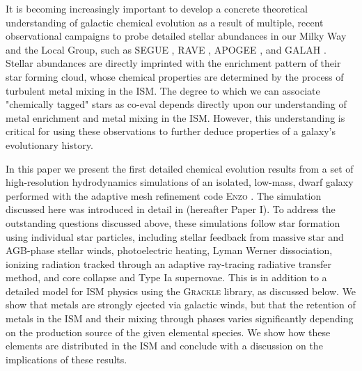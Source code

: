 \documentclass[twocolumn]{aastex61}
\begin{document}
It is becoming increasingly important to develop a concrete theoretical understanding of galactic chemical evolution as a result of multiple, recent observational campaigns to probe detailed stellar abundances in our Milky Way and the Local Group, such as SEGUE \citep{Yanny2009}, RAVE \citep{Kunder2017}, APOGEE \citep{Anders2014}, and GALAH \citep{Buder2018}. Stellar abundances are directly imprinted with the enrichment pattern of their star forming cloud, whose chemical properties are determined by the process of turbulent metal mixing in the ISM. The degree to which we can associate "chemically tagged" stars as co-eval depends directly upon our understanding of metal enrichment and metal mixing in the ISM. However, this understanding is critical for using these observations to further deduce properties of a galaxy's evolutionary history.

In this paper we present the first detailed chemical evolution results from a set of high-resolution hydrodynamics simulations of an isolated, low-mass, dwarf galaxy performed with the adaptive mesh refinement code \textsc{Enzo} \citep{Enzo2014}. The simulation discussed here was introduced in detail in \cite{Emerick2018} (hereafter Paper I). To address the outstanding questions discussed above, these simulations follow star formation using individual star particles, including stellar feedback from massive star and AGB-phase stellar winds, photoelectric heating, Lyman Werner dissociation, ionizing radiation tracked through an adaptive ray-tracing radiative transfer method, and core collapse and Type Ia supernovae. This is in addition to a detailed model for ISM physics using the \textsc{Grackle} library, as discussed below. We show that metals are strongly ejected via galactic winds, but that the retention of metals in the ISM and their mixing through phases varies significantly depending on the production source of the given elemental species. We show how these elements are distributed in the ISM and conclude with a discussion on the implications of these results.
\end{document}
